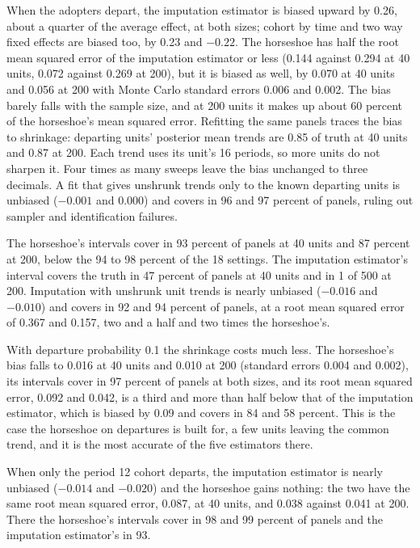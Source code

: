 When the adopters depart, the imputation estimator is biased upward by 0.26, about a quarter of the average effect, at both sizes; cohort by time and two way fixed effects are biased too, by 0.23 and $-0.22$. The horseshoe has half the root mean squared error of the imputation estimator or less (0.144 against 0.294 at 40 units, 0.072 against 0.269 at 200), but it is biased as well, by 0.070 at 40 units and 0.056 at 200 with Monte Carlo standard errors 0.006 and 0.002. The bias barely falls with the sample size, and at 200 units it makes up about 60 percent of the horseshoe's mean squared error. Refitting the same panels traces the bias to shrinkage: departing units' posterior mean trends are 0.85 of truth at 40 units and 0.87 at 200. Each trend uses its unit's 16 periods, so more units do not sharpen it. Four times as many sweeps leave the bias unchanged to three decimals. A fit that gives unshrunk trends only to the known departing units is unbiased ($-0.001$ and 0.000) and covers in 96 and 97 percent of panels, ruling out sampler and identification failures.

The horseshoe's intervals cover in 93 percent of panels at 40 units and 87 percent at 200, below the 94 to 98 percent of the 18 settings. The imputation estimator's interval covers the truth in 47 percent of panels at 40 units and in 1 of 500 at 200. Imputation with unshrunk unit trends is nearly unbiased ($-0.016$ and $-0.010$) and covers in 92 and 94 percent of panels, at a root mean squared error of 0.367 and 0.157, two and a half and two times the horseshoe's.

With departure probability 0.1 the shrinkage costs much less. The horseshoe's bias falls to 0.016 at 40 units and 0.010 at 200 (standard errors 0.004 and 0.002), its intervals cover in 97 percent of panels at both sizes, and its root mean squared error, 0.092 and 0.042, is a third and more than half below that of the imputation estimator, which is biased by 0.09 and covers in 84 and 58 percent. This is the case the horseshoe on departures is built for, a few units leaving the common trend, and it is the most accurate of the five estimators there.

When only the period 12 cohort departs, the imputation estimator is nearly unbiased ($-0.014$ and $-0.020$) and the horseshoe gains nothing: the two have the same root mean squared error, 0.087, at 40 units, and 0.038 against 0.041 at 200. There the horseshoe's intervals cover in 98 and 99 percent of panels and the imputation estimator's in 93.

